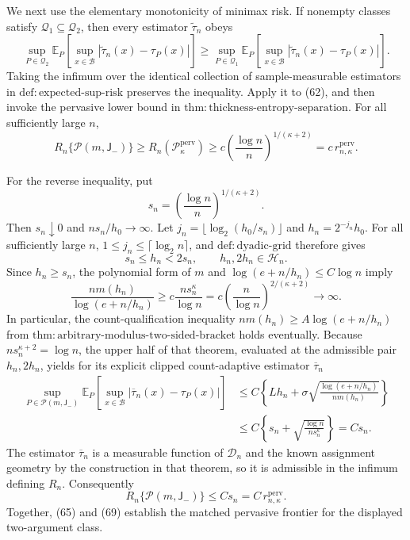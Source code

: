 We next use the elementary monotonicity of minimax risk.  If nonempty classes satisfy \(\mathcal Q_1\subseteq\mathcal Q_2\), then every estimator \(\widetilde\tau_n\) obeys
\[
 \sup_{P\in\mathcal Q_2}
 \mathbb E_P\!\left[\sup_{x\in\mathcal B}
 |\widetilde\tau_n(x)-\tau_P(x)|\right]
 \ge
 \sup_{P\in\mathcal Q_1}
 \mathbb E_P\!\left[\sup_{x\in\mathcal B}
 |\widetilde\tau_n(x)-\tau_P(x)|\right].
\]
Taking the infimum over the identical collection of sample-measurable estimators in \(\mathrm{def:expected\text{-}sup\text{-}risk}\) preserves the inequality.  Apply it to (62), and then invoke the pervasive lower bound in \(\mathrm{thm:thickness\text{-}entropy\text{-}separation}\).  For all sufficiently large \(n\),
\[
 R_n\{\mathcal P(m,\mathsf J_{-})\}
 \ge R_n(\mathcal P_{\kappa}^{\mathrm{perv}})
 \ge c\left(\frac{\log n}{n}\right)^{1/(\kappa+2)}
 =c\,r_{n,\kappa}^{\mathrm{perv}}. \tag{65}
\]

For the reverse inequality, put
\[
 s_n=\left(\frac{\log n}{n}\right)^{1/(\kappa+2)}.
\]
Then \(s_n\downarrow0\) and \(ns_n/h_0\to\infty\).  Let \(j_n=\lfloor\log_2(h_0/s_n)\rfloor\) and \(h_n=2^{-j_n}h_0\).  For all sufficiently large \(n\), \(1\le j_n\le\lceil\log_2 n\rceil\), and \(\mathrm{def:dyadic\text{-}grid}\) therefore gives
\[
 s_n\le h_n<2s_n,
 \qquad h_n,2h_n\in\mathcal H_n. \tag{66}
\]
Since \(h_n\ge s_n\), the polynomial form of \(m\) and \(\log(e+n/h_n)\le C\log n\) imply
\[
 \frac{nm(h_n)}{\log(e+n/h_n)}
 \ge c\frac{ns_n^\kappa}{\log n}
 =c\left(\frac n{\log n}\right)^{2/(\kappa+2)}
 \longrightarrow\infty. \tag{67}
\]
In particular, the count-qualification inequality \(nm(h_n)\ge A\log(e+n/h_n)\) from \(\mathrm{thm:arbitrary\text{-}modulus\text{-}two\text{-}sided\text{-}bracket}\) holds eventually.  Because \(ns_n^{\kappa+2}=\log n\), the upper half of that theorem, evaluated at the admissible pair \(h_n,2h_n\), yields for its explicit clipped count-adaptive estimator \(\overline\tau_n\)
\[
 \begin{aligned}
 \sup_{P\in\mathcal P(m,\mathsf J_{-})}
 \mathbb E_P\!\left[\sup_{x\in\mathcal B}
 |\overline\tau_n(x)-\tau_P(x)|\right]
 &\le C\left\{Lh_n+
 \sigma\sqrt{\frac{\log(e+n/h_n)}{nm(h_n)}}\right\}\\
 &\le C\left\{s_n+
 \sqrt{\frac{\log n}{ns_n^\kappa}}\right\}
 =Cs_n. \tag{68}
 \end{aligned}
\]
The estimator \(\overline\tau_n\) is a measurable function of \(\mathcal D_n\) and the known assignment geometry by the construction in that theorem, so it is admissible in the infimum defining \(R_n\).  Consequently
\[
 R_n\{\mathcal P(m,\mathsf J_{-})\}
 \le Cs_n
 =C\,r_{n,\kappa}^{\mathrm{perv}}. \tag{69}
\]
Together, (65) and (69) establish the matched pervasive frontier for the displayed two-argument class.

